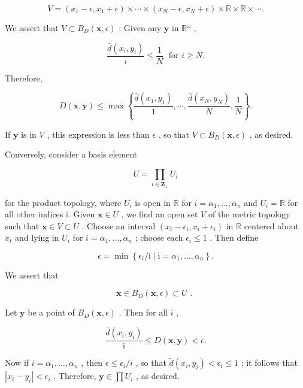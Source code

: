 \[
V = \left( {{x}_{1} - \epsilon ,{x}_{1} + \epsilon }\right)  \times  \cdots  \times  \left( {{x}_{N} - \epsilon ,{x}_{N} + \epsilon }\right)  \times  \mathbb{R} \times  \mathbb{R} \times  \cdots .
\]

We assert that \(V \subset  {B}_{D}\left( {\mathbf{x},\epsilon }\right)\) : Given any \(\mathbf{y}\) in \({\mathbb{R}}^{\omega }\) ,

\[
\frac{\bar{d}\left( {{x}_{i},{y}_{i}}\right) }{i} \leq  \frac{1}{N}\;\text{ for }i \geq  N.
\]

Therefore,

\[
D\left( {\mathbf{x},\mathbf{y}}\right)  \leq  \max \left\{  {\frac{\bar{d}\left( {{x}_{1},{y}_{1}}\right) }{1},\cdots ,\frac{\bar{d}\left( {{x}_{N},{y}_{N}}\right) }{N},\frac{1}{N}}\right\}  .
\]

If \(\mathbf{y}\) is in \(V\) , this expression is less than \(\epsilon\) , so that \(V \subset  {B}_{D}\left( {\mathbf{x},\epsilon }\right)\) , as desired.

Conversely, consider a basis element

\[
U = \mathop{\prod }\limits_{{i \in  {\mathbf{Z}}_{ + }}}{U}_{i}
\]

for the product topology, where \({U}_{i}\) is open in \(\mathbb{R}\) for \(i = {\alpha }_{1},\ldots ,{\alpha }_{n}\) and \({U}_{i} = \mathbb{R}\) for all other indices i. Given \(\mathbf{x} \in  U\) , we find an open set \(V\) of the metric topology such that \(\mathbf{x} \in  V \subset  U\) . Choose an interval \(\left( {{x}_{t} - {\epsilon }_{i},{x}_{i} + {\epsilon }_{i}}\right)\) in \(\mathbb{R}\) centered about \({x}_{t}\) and lying in \({U}_{i}\) for \(i = {\alpha }_{1},\ldots ,{\alpha }_{n}\) ; choose each \({\epsilon }_{i} \leq  1\) . Then define

\[
\epsilon  = \min \left\{  {{\epsilon }_{i}/\mathrm{i} \mid  \mathrm{i} = {\alpha }_{1},\ldots ,{\alpha }_{n}}\right\}  .
\]

We assert that

\[
\mathbf{x} \in  {B}_{D}\left( {\mathbf{x},\epsilon }\right)  \subset  U\text{ . }
\]

Let \(\mathbf{y}\) be a point of \({B}_{D}\left( {\mathbf{x},\epsilon }\right)\) . Then for all \(i\) ,

\[
\frac{\bar{d}\left( {{x}_{i},{y}_{i}}\right) }{\mathrm{i}} \leq  D\left( {\mathbf{x},\mathbf{y}}\right)  < \epsilon .
\]

Now if \(i = {\alpha }_{1},\ldots ,{\alpha }_{n}\) , then \(\epsilon  \leq  {\epsilon }_{i}/i\) , so that \(\widetilde{d}\left( {{x}_{i},{y}_{i}}\right)  < {\epsilon }_{i} \leq  1\) ; it follows that \(\left| {{x}_{i} - {y}_{i}}\right|  < {\epsilon }_{i}\) . Therefore, \(\mathbf{y} \in  \prod {U}_{i}\) , as desired.

